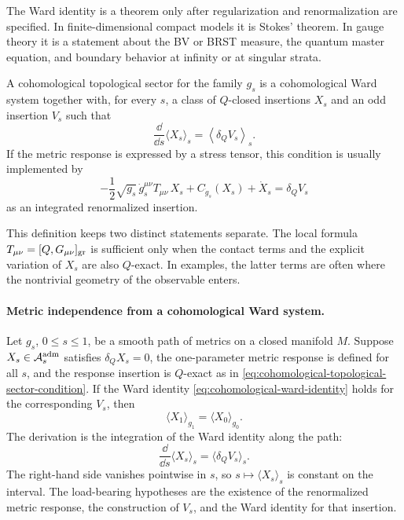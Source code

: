 The Ward identity is a theorem only after regularization and renormalization
are specified.  In finite-dimensional compact models it is Stokes' theorem.
In gauge theory it is a statement about the BV or BRST measure, the quantum
master equation, and boundary behavior at infinity or at singular strata.

\begin{definition}
\label{def:cohomological-topological-sector}
A cohomological topological sector for the family \(g_s\) is a
cohomological Ward system together with, for every \(s\), a class of
\(Q\)-closed insertions \(X_s\) and an odd insertion \(V_s\) such that
\begin{equation}
  \frac{\dd}{\dd s}\langle X_s\rangle_s
  =
  \left\langle
    \delta_Q V_s
  \right\rangle_s .
  \label{eq:cohomological-topological-sector-condition}
\end{equation}
If the metric response is expressed by a stress tensor, this condition is
usually implemented by
\begin{equation}
  -\frac12\sqrt{g_s}\,\dot g_s^{\mu\nu}T_{\mu\nu}\,X_s
  +
  C_{\dot g_s}(X_s)+\dot X_s
  =
  \delta_Q V_s
  \label{eq:stress-response-q-exact-family}
\end{equation}
as an integrated renormalized insertion.
\end{definition}

This definition keeps two distinct statements separate.  The local formula
\(T_{\mu\nu}=[Q,G_{\mu\nu}]_{\rm gr}\) is sufficient only when the contact
terms and the explicit variation of \(X_s\) are also \(Q\)-exact.  In
examples, the latter terms are often where the nontrivial geometry of the
observable enters.

\paragraph{Metric independence from a cohomological Ward system.}
Let \(g_s\), \(0\le s\le1\), be a smooth path of metrics on a closed
manifold \(M\).  Suppose \(X_s\in\mathcal A_s^{\rm adm}\) satisfies
\(\delta_QX_s=0\), the one-parameter metric response is defined for all
\(s\), and the response insertion is \(Q\)-exact as in
\eqref{eq:cohomological-topological-sector-condition}.  If the Ward identity
\eqref{eq:cohomological-ward-identity} holds for the corresponding \(V_s\),
then
\[
  \langle X_1\rangle_{g_1}
  =
  \langle X_0\rangle_{g_0}.
\]
The derivation is the integration of the Ward identity along the path:
\[
  \frac{\dd}{\dd s}\langle X_s\rangle_s
  =
  \langle\delta_QV_s\rangle_s .
\]
The right-hand side vanishes pointwise in \(s\), so
\(s\mapsto\langle X_s\rangle_s\) is constant on the interval.  The
load-bearing hypotheses are the existence of the renormalized metric response,
the construction of \(V_s\), and the Ward identity for that insertion.

